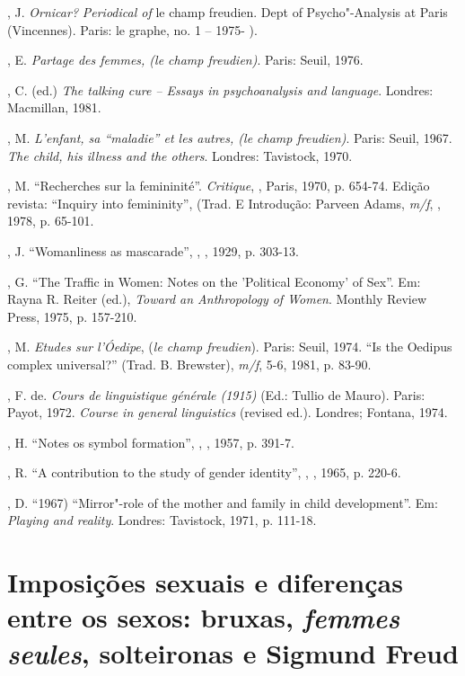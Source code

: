 , J. \emph{Ornicar?} \emph{Periodical of} le champ freudien. Dept
of Psycho"-Analysis at Paris  (Vincennes). Paris: le graphe, no. 1 --
1975- ).

, E. \emph{Partage des femmes, (le champ freudien)}.
Paris: Seuil, 1976.

, C. (ed.) \emph{The talking cure -- Essays in psychoanalysis and
language}. Londres: Macmillan, 1981.

, M. \emph{L'enfant, sa ``maladie'' et les autres, (le champ
freudien)}. Paris: Seuil, 1967. \emph{The child, his illness and the
others}. Londres: Tavistock, 1970.

, M. ``Recherches sur la femininité''. \emph{Critique}, ,
Paris, 1970, p. 654-74. Edição revista: ``Inquiry into femininity'',
(Trad. E Introdução: Parveen Adams, \emph{m/f}, , 1978, p. 65-101.

, J. ``Womanliness as mascarade'', \emph{}, , 1929, p.
303-13.

, G. ``The Traffic in Women: Notes on the 'Political Economy' of
Sex''. Em: Rayna R. Reiter (ed.), \emph{Toward an Anthropology of
Women}. Monthly Review Press, 1975, p. 157-210.

, M. \emph{Etudes sur l'Óedipe}, (\emph{le champ freudien}).
Paris: Seuil, 1974. ``Is the Oedipus complex universal?'' (Trad. B.
Brewster), \emph{m/f}, 5-6, 1981, p. 83-90.

, F. de. \emph{Cours de linguistique générale (1915)} (Ed.:
Tullio de Mauro). Paris: Payot, 1972. \emph{Course in general
linguistics} (revised ed.). Londres; Fontana, 1974.

, H. ``Notes os symbol formation'', \emph{}, , 1957,
p. 391-7.

, R. ``A contribution to the study of gender identity'',
\emph{}, , 1965, p. 220-6.

, D. ``1967) ``Mirror"-role of the mother and family in child
development''. Em: \emph{Playing and reality}. Londres: Tavistock, 1971,
p. 111-18.

\chapter*{Imposições sexuais e diferenças entre os sexos: bruxas,
\emph{femmes seules}, solteironas e Sigmund Freud}


